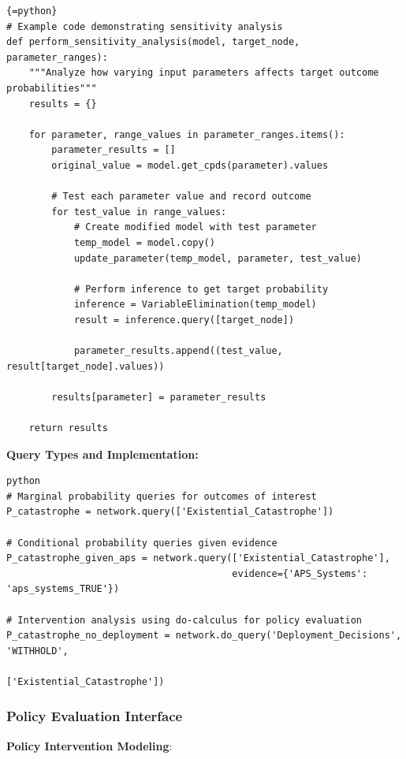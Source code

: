 \documentclass[
  11pt,
  letterpaper,
]{book}
\begin{document}
\begin{verbatim}
{=python}
# Example code demonstrating sensitivity analysis
def perform_sensitivity_analysis(model, target_node, parameter_ranges):
    """Analyze how varying input parameters affects target outcome probabilities"""
    results = {}
    
    for parameter, range_values in parameter_ranges.items():
        parameter_results = []
        original_value = model.get_cpds(parameter).values
        
        # Test each parameter value and record outcome
        for test_value in range_values:
            # Create modified model with test parameter
            temp_model = model.copy()
            update_parameter(temp_model, parameter, test_value)
            
            # Perform inference to get target probability
            inference = VariableElimination(temp_model)
            result = inference.query([target_node])
            
            parameter_results.append((test_value, result[target_node].values))
            
        results[parameter] = parameter_results
        
    return results
\end{verbatim}

\textbf{Query Types and Implementation:}

\begin{verbatim}
python
# Marginal probability queries for outcomes of interest
P_catastrophe = network.query(['Existential_Catastrophe'])

# Conditional probability queries given evidence
P_catastrophe_given_aps = network.query(['Existential_Catastrophe'], 
                                        evidence={'APS_Systems': 'aps_systems_TRUE'})

# Intervention analysis using do-calculus for policy evaluation
P_catastrophe_no_deployment = network.do_query('Deployment_Decisions', 'WITHHOLD',
                                               ['Existential_Catastrophe'])
\end{verbatim}

\subsubsection{Policy Evaluation Interface}\label{sec-policy-evaluation}

\textbf{Policy Intervention Modeling}:
\end{document}
